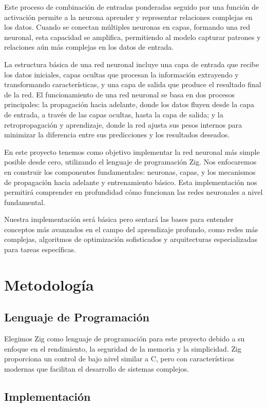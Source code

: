 \documentclass[twocolumn]{article}
\begin{document}
Este proceso de combinación de entradas ponderadas seguido por una función de activación permite a la neurona aprender y representar relaciones complejas en los datos. Cuando se conectan múltiples neuronas en capas, formando una red neuronal, esta capacidad se amplifica, permitiendo al modelo capturar patrones y relaciones aún más complejas en los datos de entrada.

La estructura básica de una red neuronal incluye una capa de entrada que recibe los datos iniciales, capas ocultas que procesan la información extrayendo y transformando características, y una capa de salida que produce el resultado final de la red. El funcionamiento de una red neuronal se basa en dos procesos principales: la propagación hacia adelante, donde los datos fluyen desde la capa de entrada, a través de las capas ocultas, hasta la capa de salida; y la retropropagación y aprendizaje, donde la red ajusta sus pesos internos para minimizar la diferencia entre sus predicciones y los resultados deseados.


En este proyecto tenemos como objetivo implementar la red neuronal más simple posible desde cero, utilizando el lenguaje de programación Zig. Nos enfocaremos en construir los componentes fundamentales: neuronas, capas, y los mecanismos de propagación hacia adelante y entrenamiento básico. Esta implementación nos permitirá comprender en profundidad cómo funcionan las redes neuronales a nivel fundamental.

Nuestra implementación será básica pero sentará las bases para entender conceptos más avanzados en el campo del aprendizaje profundo, como redes más complejas, algoritmos de optimización sofisticados y arquitecturas especializadas para tareas específicas.

\section{Metodología}
\subsection*{Lenguaje de Programación}
Elegimos Zig como lenguaje de programación para este proyecto debido a su enfoque en el rendimiento, la seguridad de la memoria y la simplicidad. Zig proporciona un control de bajo nivel similar a C, pero con características modernas que facilitan el desarrollo de sistemas complejos.

\subsection*{Implementación}
\end{document}

